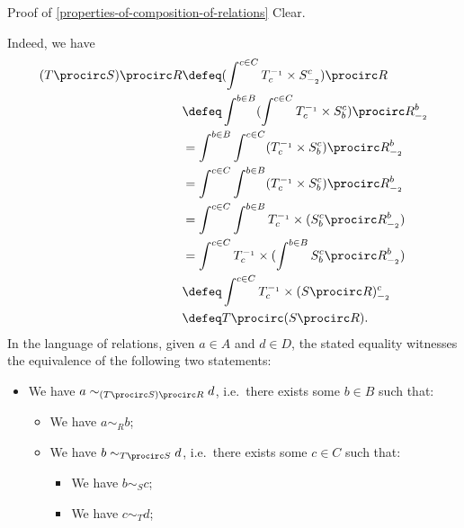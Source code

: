 \begin{Proof}{Proof of \cref{properties-of-composition-of-relations}}%
    Clear.

    Indeed, we have
    \begin{align*}
        (T\procirc S)\procirc R &\defeq (\int^{c\in C}T^{-_{1}}_{c}\times S^{c}_{-_{2}})\procirc R\\
                                &\defeq \int^{b\in B}(\int^{c\in C}T^{-_{1}}_{c}\times S^{c}_{b})\procirc R^{b}_{-_{2}}\\
                                &=      \int^{b\in B}\int^{c\in C}(T^{-_{1}}_{c}\times S^{c}_{b})\procirc R^{b}_{-_{2}}\\
                                &=      \int^{c\in C}\int^{b\in B}(T^{-_{1}}_{c}\times S^{c}_{b})\procirc R^{b}_{-_{2}}\\
                                &=      \int^{c\in C}\int^{b\in B}T^{-_{1}}_{c}\times(S^{c}_{b}\procirc R^{b}_{-_{2}})\\
                                &=      \int^{c\in C}T^{-_{1}}_{c}\times(\int^{b\in B}S^{c}_{b}\procirc R^{b}_{-_{2}})\\
                                &\defeq \int^{c\in C}T^{-_{1}}_{c}\times(S\procirc R)^{c}_{-_{2}}\\
                                &\defeq T\procirc(S\procirc R).
    \end{align*}
    In the language of relations, given $a\in A$ and $d\in D$, the stated equality witnesses the equivalence of the following two statements:
    \begin{itemize}
        \item We have $a\sim_{(T\procirc S)\procirc R}d$, i.e.\ there exists some $b\in B$ such that:
            \begin{itemize}
                \item We have $a\sim_{R}b$;
                \item We have $b\sim_{T\procirc S}d$, i.e.\ there exists some $c\in C$ such that:
                    \begin{itemize}
                        \item We have $b\sim_{S}c$;
                        \item We have $c\sim_{T}d$;
                    \end{itemize}

\end{itemize}
\end{itemize}
\end{Proof}
